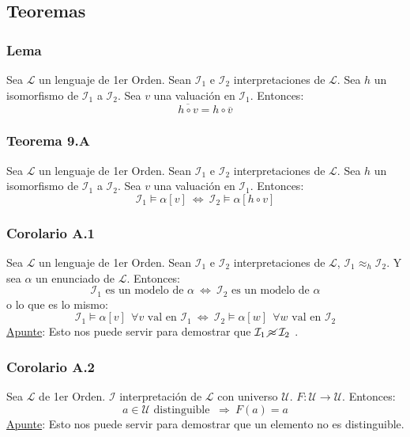 \documentclass{article}
\newcommand{\lenguaje}{\mathcal{L}}
\newcommand{\interpretacion}{\mathcal{I}}
\newcommand{\universo}{\mathcal{U}}
\newcommand{\Rightarrows}{\: \Rightarrow \:}            %
\newcommand{\Leftrightarrows}{\: \Leftrightarrow \:}    %
\begin{document}
\subsection{Teoremas}
\subsubsection{Lema}
Sea $\lenguaje$ un lenguaje de 1er Orden. Sean $\interpretacion_1$ e $\interpretacion_2$ interpretaciones de $\lenguaje$. Sea $h$ un isomorfismo de $\interpretacion_1$ a $\interpretacion_2$. Sea $v$ una valuación en $\interpretacion_1$. Entonces:
\begin{equation*}
    \overline{h \circ v} = h \circ \overline{v}
\end{equation*}
\subsubsection{Teorema 9.A}
Sea $\lenguaje$ un lenguaje de 1er Orden. Sean $\interpretacion_1$ e $\interpretacion_2$ interpretaciones de $\lenguaje$. Sea $h$ un isomorfismo de $\interpretacion_1$ a $\interpretacion_2$. Sea $v$ una valuación en $\interpretacion_1$. Entonces:
\begin{equation*}
    \interpretacion_1 \vDash \alpha[v] \Leftrightarrows \interpretacion_2 \vDash \alpha[h \circ v]
\end{equation*}
\subsubsection{Corolario A.1}
Sea $\lenguaje$ un lenguaje de 1er Orden. Sean $\interpretacion_1$ e $\interpretacion_2$ interpretaciones de $\lenguaje$,  $\interpretacion_1 \approx_h \interpretacion_2$. Y sea $\alpha$ un enunciado de $\lenguaje$. Entonces:
\begin{equation*}
    \interpretacion_1 \text{ es un modelo de } \alpha \Leftrightarrows \interpretacion_2 \text{ es un modelo de } \alpha
\end{equation*}
o lo que es lo mismo:
\begin{equation*}
    \interpretacion_1 \vDash \alpha[v] \:\: \forall v \text{ val en } \interpretacion_1 \Leftrightarrows
    \interpretacion_2 \vDash \alpha[w] \:\: \forall w \text{ val en } \interpretacion_2
\end{equation*}
\underline{Apunte}: Esto nos puede servir para demostrar que  $\interpretacion_1 \: \cancel{\approx} \: \interpretacion_2$ .
\subsubsection{Corolario A.2}
Sea $\lenguaje$ de 1er Orden. $\interpretacion$ interpretación de $\lenguaje$ con universo $\universo$. $F: \universo \rightarrow \universo$. Entonces:
\begin{equation*}
    a \in \universo \text{ distinguible } \Rightarrows F(a) = a
\end{equation*}
\underline{Apunte}: Esto nos puede servir para demostrar que un elemento no es distinguible.
\end{document}
